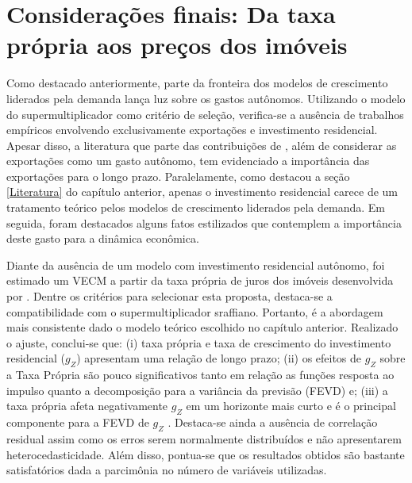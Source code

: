 \section{Considerações finais: Da taxa própria aos preços dos imóveis}
\label{Conclucao_Empirica}


Como destacado anteriormente, parte da fronteira dos modelos de crescimento liderados pela demanda lança luz sobre os gastos autônomos. Utilizando o modelo do supermultiplicador como critério de seleção, verifica-se a ausência de trabalhos empíricos envolvendo exclusivamente exportações e investimento residencial. Apesar disso, a literatura que parte das contribuições de \textcite{mccombie_balance--payments_1994}, além de considerar as exportações como um gasto autônomo, tem evidenciado  a importância das exportações para o longo prazo. Paralelamente, como destacou a seção \ref{Literatura} do capítulo anterior, apenas o investimento residencial carece de um tratamento teórico pelos modelos de crescimento liderados pela demanda. Em seguida, foram destacados alguns fatos estilizados que contemplem a importância deste gasto para a dinâmica econômica.



Diante da ausência de um modelo com investimento residencial autônomo, foi estimado um VECM a partir da taxa própria de juros dos imóveis desenvolvida por \textcite{teixeira_crescimento_2015}. Dentre os critérios para selecionar esta proposta, destaca-se a compatibilidade com o supermultiplicador sraffiano. Portanto, é a abordagem mais consistente dado o modelo teórico escolhido no capítulo anterior. Realizado o ajuste, conclui-se que: 
(i) taxa própria e taxa de crescimento do investimento residencial ($g_Z$) apresentam uma relação de longo prazo; 
(ii) os efeitos de $g_Z$ sobre a Taxa Própria são pouco significativos tanto em relação as funções resposta ao impulso quanto a decomposição para a variância da previsão (FEVD) e;
(iii) a taxa própria afeta negativamente $g_Z$ em um horizonte mais curto e é o principal componente para a FEVD de $g_Z$
. 
Destaca-se ainda a ausência de correlação residual assim como os erros serem normalmente distribuídos e não apresentarem heterocedasticidade. Além disso, pontua-se que os resultados obtidos são bastante satisfatórios dada a parcimônia no número de variáveis utilizadas.

